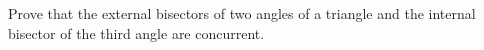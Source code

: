 Prove that the external bisectors of two angles of a triangle and the internal bisector of the third angle are concurrent.
